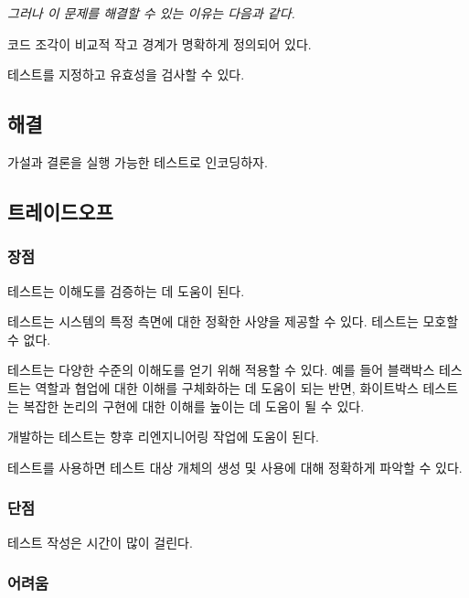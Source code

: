\documentclass[a4paper,10pt,twoside]{book}
\begin{document}
\emph{그러나 이 문제를 해결할 수 있는 이유는 다음과 같다.}

\begin{bulletlist}
\item 코드 조각이 비교적 작고 경계가 명확하게 정의되어 있다.
\item 테스트를 지정하고 유효성을 검사할 수 있다.
\end{bulletlist}

\subsection*{해결}

가설과 결론을 실행 가능한 테스트로 인코딩하자.

\subsection*{트레이드오프}

\subsubsection*{장점}

\begin{bulletlist}
\item 테스트는 이해도를 검증하는 데 도움이 된다.
\item 테스트는 시스템의 특정 측면에 대한 정확한 사양을 제공할 수 있다. 테스트는 모호할 수 없다.
\item 테스트는 다양한 수준의 이해도를 얻기 위해 적용할 수 있다. 예를 들어 블랙박스 테스트는 역할과 협업에 대한 이해를 구체화하는 데 도움이 되는 반면, 화이트박스 테스트는 복잡한 논리의 구현에 대한 이해를 높이는 데 도움이 될 수 있다.
\item 개발하는 테스트는 향후 리엔지니어링 작업에 도움이 된다.
\item 테스트를 사용하면 테스트 대상 개체의 생성 및 사용에 대해 정확하게 파악할 수 있다.
\end{bulletlist}

\subsubsection*{단점}

\begin{bulletlist}
\item 테스트 작성은 시간이 많이 걸린다.
\end{bulletlist}

\subsubsection*{어려움}
\end{document}
